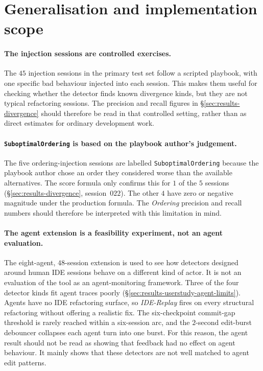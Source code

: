 \section{Generalisation and implementation scope}
\label{sec:threats-external}

\paragraph{The injection sessions are controlled exercises.}
The $45$ injection sessions in the primary test set follow a scripted playbook, with one specific bad behaviour injected into each session. This makes them useful for checking whether the detector finds known divergence kinds, but they are not typical refactoring sessions. The precision and recall figures in \S\ref{sec:results-divergence} should therefore be read in that controlled setting, rather than as direct estimates for ordinary development work.

\paragraph{\texttt{SuboptimalOrdering} is based on the playbook author's judgement.}
The five ordering-injection sessions are labelled \texttt{SuboptimalOrdering} because the playbook author chose an order they considered worse than the available alternatives. The score formula only confirms this for $1$ of the $5$ sessions (\S\ref{sec:results-divergence}, session~$022$). The other $4$ have zero or negative magnitude under the production formula. The \emph{Ordering} precision and recall numbers should therefore be interpreted with this limitation in mind.

\paragraph{The agent extension is a feasibility experiment, not an agent evaluation.}
The eight-agent, $48$-session extension is used to see how detectors designed around human IDE sessions behave on a different kind of actor. It is not an evaluation of the tool as an agent-monitoring framework. Three of the four detector kinds fit agent traces poorly (\S\ref{sec:results-userstudy-agent-limits}). Agents have no IDE refactoring surface, so \emph{IDE-Replay} fires on every structural refactoring without offering a realistic fix. The six-checkpoint commit-gap threshold is rarely reached within a six-session arc, and the $2$-second edit-burst debouncer collapses each agent turn into one burst. For this reason, the agent result should not be read as showing that feedback had no effect on agent behaviour. It mainly shows that these detectors are not well matched to agent edit patterns.

